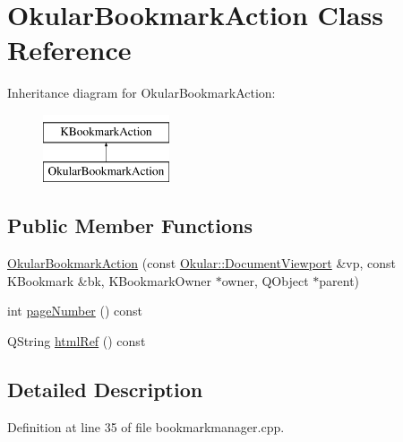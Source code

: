 \hypertarget{classOkularBookmarkAction}{\section{Okular\+Bookmark\+Action Class Reference}
\label{classOkularBookmarkAction}
}
Inheritance diagram for Okular\+Bookmark\+Action\+:\begin{figure}[H]
\begin{center}
\leavevmode
\includegraphics[height=2.000000cm]{classOkularBookmarkAction}
\end{center}
\end{figure}
\subsection*{Public Member Functions}
\begin{DoxyCompactItemize}
\item 
\hyperlink{classOkularBookmarkAction_ac7bbdfa19d22c93714e02f61ffeff740}{Okular\+Bookmark\+Action} (const \hyperlink{classOkular_1_1DocumentViewport}{Okular\+::\+Document\+Viewport} \&vp, const K\+Bookmark \&bk, K\+Bookmark\+Owner $\ast$owner, Q\+Object $\ast$parent)
\item 
int \hyperlink{classOkularBookmarkAction_a7fd944e9858a50072719b13962d10e2c}{page\+Number} () const 
\item 
Q\+String \hyperlink{classOkularBookmarkAction_a942d869d0fd16b04450bd13546c6d9d9}{html\+Ref} () const 
\end{DoxyCompactItemize}


\subsection{Detailed Description}


Definition at line 35 of file bookmarkmanager.\+cpp.



